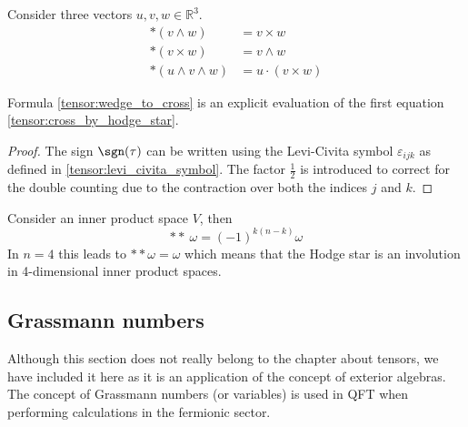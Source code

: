 	\begin{result}
		\label{tensor:hodge_star_vectorcalculus}
		Consider three vectors $u, v, w\in\mathbb{R}^3$.
		\begin{align}
			\ast(v\wedge w) &= v\times w \label{tensor:cross_by_hodge_star}\\
			\ast(v\times w) &= v\wedge w\\
			\ast(u\wedge v\wedge w) &= u\cdot(v\times w)
		\end{align}
	\end{result}
	\begin{remark}
		Formula \ref{tensor:wedge_to_cross} is an explicit evaluation of the first equation \ref{tensor:cross_by_hodge_star}.
		\begin{proof}
			The sign $\sgn(\tau)$ can be written using the Levi-Civita symbol $\varepsilon_{ijk}$ as defined in \ref{tensor:levi_civita_symbol}. The factor $\frac{1}{2}$ is introduced to correct for the double counting due to the contraction over both the indices $j$ and $k$.
		\end{proof}
	\end{remark}
	
	\begin{property}
		Consider an inner product space $V$, then
		\begin{equation}
			\boxed{\ast\ast\ \omega = (-1)^{k(n-k)}\omega}
		\end{equation}
		In $n=4$ this leads to $\ast\ast\omega = \omega$ which means that the Hodge star is an involution in 4-dimensional inner product spaces.
	\end{property}
	
	
\subsection{Grassmann numbers}

	Although this section does not really belong to the chapter about tensors, we have included it here as it is an application of the concept of exterior algebras. The concept of Grassmann numbers (or variables) is used in QFT when performing calculations in the fermionic sector.
	
